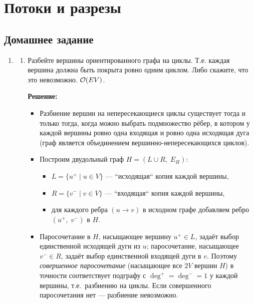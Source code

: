 \section{Потоки и разрезы}

\subsection{Домашнее задание}
\begin{enumerate}

  \item
    \begin{enumerate}
      \item
        Разбейте вершины ориентированного графа на циклы. Т.е. каждая вершина должна быть покрыта ровно одним циклом.
        Либо скажите, что это невозможно. $\mathcal{O}(E V)$.

        \textbf{Решение:}

        \begin{itemize}
          \item Разбиение вершин на непересекающиеся циклы существует тогда и только тогда,
          когда можно выбрать подмножество рёбер, в котором у каждой вершины ровно одна входящая
          и ровно одна исходящая дуга (граф является объединением вершинно-непересекающихся циклов).

          \item Построим двудольный граф $H = (L \cup R,\; E_H)$:
          \begin{itemize}
            \item $L = \{u^+ \mid u \in V\}$ --- ``исходящая`` копия каждой вершины,
            \item $R = \{v^- \mid v \in V\}$ --- ``входящая`` копия каждой вершины,
            \item для каждого ребра $(u \to v)$ в исходном графе добавляем ребро $(u^+,\; v^-)$ в $H$.
          \end{itemize}

          \item Паросочетание в $H$, насыщающее вершину $u^+ \in L$, задаёт выбор
          единственной исходящей дуги из $u$; паросочетание, насыщающее $v^- \in R$, задаёт выбор
          единственной входящей дуги в $v$. Поэтому \emph{совершенное паросочетание} (насыщающее
          все $2V$ вершин $H$) в точности соответствует подграфу с $\deg^+ = \deg^- = 1$ у каждой
          вершины, т.е.\ разбиению на циклы.
          Если совершенного паросочетания нет --- разбиение невозможно.


\end{itemize}
\end{enumerate}
\end{enumerate}
